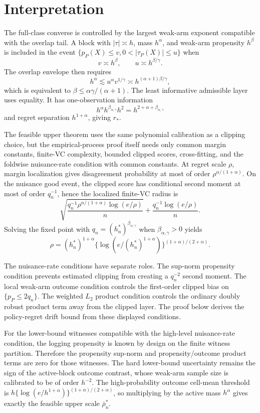 \documentclass[11pt]{article}
\theoremstyle{definition}
\theoremstyle{plain}
\theoremstyle{remark}
\begin{document}
\section{Interpretation}
The full-class converse is controlled by the largest weak-arm exponent
compatible with the overlap tail.  A block with \(|\tau|\asymp h\), mass
\(h^\alpha\), and weak-arm propensity \(h^\beta\) is included in the event
\(\{p_P(X)\le v,0<|\tau_P(X)|\le u\}\) when
\[
v\asymp h^\beta,\qquad u\asymp h^{\beta/\gamma}.
\]
The overlap envelope then requires
\[
h^\alpha\lesssim u^\alpha v^{1/\gamma}
\asymp h^{(\alpha+1)\beta/\gamma},
\]
which is equivalent to
\(\beta\le\alpha\gamma/(\alpha+1)\).  The least informative admissible layer
uses equality.  It has one-observation information
\[
h^\alpha h^{\beta_{\alpha,\gamma}}h^2
=h^{2+\alpha+\beta_{\alpha,\gamma}}
\]
and regret separation \(h^{1+\alpha}\), giving \(r_*\).

The feasible upper theorem uses the same polynomial calibration as a
clipping choice, but the empirical-process proof itself needs only common
margin constants, finite-VC complexity, bounded clipped scores,
cross-fitting, and the foldwise nuisance-rate condition with common
constants.  At regret scale \(\rho\), margin localization gives disagreement
probability at most of order \(\rho^{\alpha/(1+\alpha)}\).  On the nuisance
good event, the clipped score has conditional second moment at most of order
\(q_n^{-1}\), hence the localized finite-VC radius is
\[
\sqrt{\frac{q_n^{-1}\rho^{\alpha/(1+\alpha)}
\log(e/\rho)}{n}}
+\frac{q_n^{-1}\log(e/\rho)}{n}.
\]
Solving the fixed point with \(q_n=(h_n^*)^{\beta_{\alpha,\gamma}}\) when
\(\beta_{\alpha,\gamma}>0\) yields
\[
\rho=
(h_n^*)^{1+\alpha}
\{\log(e/(h_n^*)^{1+\alpha})\}^{(1+\alpha)/(2+\alpha)}.
\]

The nuisance-rate conditions have separate roles.  The sup-norm propensity
condition prevents estimated clipping from creating a \(q_n^{-2}\) second
moment.  The local weak-arm outcome condition controls the first-order
clipped bias on \(\{p_P\le2q_n\}\).  The weighted \(L_2\) product condition
controls the ordinary doubly robust product term away from the clipped
layer.  The proof below derives the policy-regret drift bound from these
displayed conditions.

For the lower-bound witnesses compatible with the high-level nuisance-rate
condition, the logging propensity is known by design on the finite witness
partition.  Therefore the propensity sup-norm and propensity/outcome product
terms are zero for those witnesses.  The hard lower-bound uncertainty remains
the sign of the active-block outcome contrast, whose weak-arm sample size is
calibrated to be of order \(h^{-2}\).  The high-probability outcome
cell-mean threshold is \(h\{\log(e/h^{1+\alpha})\}^{(1+\alpha)/(2+\alpha)}\),
so multiplying by the active mass \(h^\alpha\) gives exactly the feasible
upper scale \(\bar\rho_n^*\).
\end{document}
